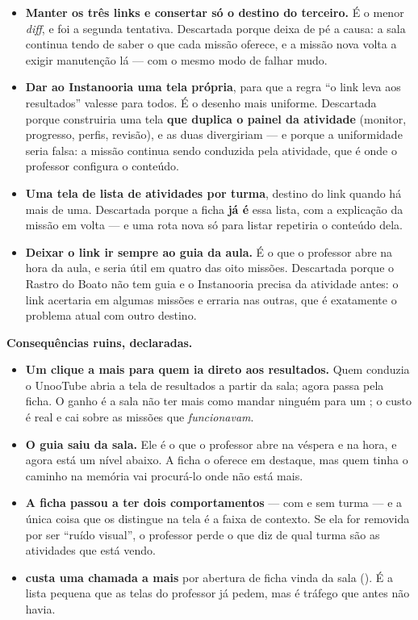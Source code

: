 \begin{itemize}
  \item \textbf{Manter os três links e consertar só o destino do terceiro.} É o
    menor \emph{diff}, e foi a segunda tentativa. Descartada porque deixa de pé
    a causa: a sala continua tendo de saber o que cada missão oferece, e a
    missão nova volta a exigir manutenção lá --- com o mesmo modo de falhar
    mudo.
  \item \textbf{Dar ao Instanooria uma tela  própria}, para
    que a regra \enquote{o link leva aos resultados} valesse para todos. É o
    desenho mais uniforme. Descartada porque construiria uma tela \textbf{que
    duplica o painel da atividade} (monitor, progresso, perfis, revisão), e as
    duas divergiriam --- e porque a uniformidade seria falsa: a missão continua
    sendo conduzida pela atividade, que é onde o professor configura o conteúdo.
  \item \textbf{Uma tela de lista de atividades por turma}, destino do link
    quando há mais de uma. Descartada porque a ficha \textbf{já é} essa lista,
    com a explicação da missão em volta --- e uma rota nova só para listar
    repetiria o conteúdo dela.
  \item \textbf{Deixar o link ir sempre ao guia da aula.} É o que o professor
    abre na hora da aula, e seria útil em quatro das oito missões. Descartada
    porque o Rastro do Boato não tem guia e o Instanooria precisa da atividade
    antes: o link acertaria em algumas missões e erraria nas outras, que é
    exatamente o problema atual com outro destino.
\end{itemize}

\textbf{Consequências ruins, declaradas.}

\begin{itemize}
  \item \textbf{Um clique a mais para quem ia direto aos resultados.} Quem
    conduzia o UnooTube abria a tela de resultados a partir da sala; agora passa
    pela ficha. O ganho é a sala não ter mais como mandar ninguém para um
    ; o custo é real e cai sobre as missões que \emph{funcionavam}.
  \item \textbf{O guia saiu da sala.} Ele é o que o professor abre na véspera e
    na hora, e agora está um nível abaixo. A ficha o oferece em destaque, mas
    quem tinha o caminho na memória vai procurá-lo onde não está mais.
  \item \textbf{A ficha passou a ter dois comportamentos} --- com e sem turma ---
    e a única coisa que os distingue na tela é a faixa de contexto. Se ela for
    removida por ser \enquote{ruído visual}, o professor perde o que diz de qual
    turma são as atividades que está vendo.
  \item \textbf{ custa uma chamada a mais} por abertura de
    ficha vinda da sala (). É a lista pequena que as
    telas do professor já pedem, mas é tráfego que antes não havia.
\end{itemize}

